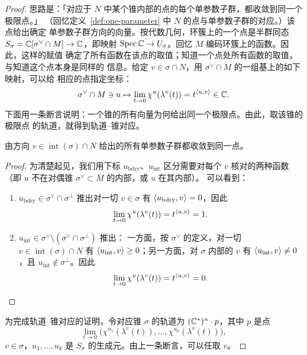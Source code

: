 \begin{proof}
思路是：「对应于 $N$ 中某个锥内部的点的每个单参数子群，都收敛到同一个极限点。」
（回忆定义~\ref{def:one-parameter} 中 $N$ 的点与单参数子群的对应。）该点给出确定
单参数子群方向的向量。按代数几何，环簇上的一个点是半群同态
$S_\sigma = \mathbb{C}[\sigma^\vee\cap M]\to\mathbb{C}$，即映射
$\operatorname{Spec}\mathbb{C}\to U_\sigma$。回忆 $M$ 编码环簇上的函数。因此，这样的赋值
确定了所有函数在该点的取值；知道一个点处所有函数的取值，与知道这个点本身是同样的
信息。给定 $v\in\sigma\cap N$，用 $\sigma^\vee\cap M$ 的一组基上的如下映射，可以给
相应的点指定坐标：
\[
\sigma^\vee\cap M\ni u\mapsto\lim_{t\to0}\chi^u(\lambda^v(t))
= t^{\langle u,v\rangle}\in\mathbb{C}.
\]
下面用一条断言说明：一个锥的所有向量为何给出同一个极限点。由此，取该锥的极限点
的轨道，就得到轨道–锥对应。

\begin{claim}\label{claim:limit-point}
由方向 $v\in\operatorname{int}(\sigma)\cap N$ 给出的所有单参数子群都收敛到同一点。
\end{claim}

\begin{proof}
为清楚起见，我们用下标 $u_{\mathrm{bdry}}$、$u_{\mathrm{int}}$ 区分需要对每个 $v$
核对的两种函数（即 $u$ 不在对偶锥 $\sigma^\vee\subset M$ 的内部，或 $u$ 在其内部）。
可以看到：
\begin{enumerate}[leftmargin=2.6em,itemsep=0.3em]
\item $u_{\mathrm{bdry}}\in\sigma^\vee\cap\sigma^\perp$ 推出对一切 $v\in\sigma$ 有
  $\langle u_{\mathrm{bdry}},v\rangle=0$，因此
  \[
  \lim_{t\to0}\chi^u(\lambda^v(t)) = t^{\langle u,v\rangle} = 1.
  \]
\item $u_{\mathrm{int}}\in\sigma^\vee\setminus(\sigma^\vee\cap\sigma^\perp)$ 推出：
  一方面，按 $\sigma^\vee$ 的定义，对一切 $v\in\operatorname{int}(\sigma)\cap N$
  有 $\langle u_{\mathrm{int}},v\rangle\ge 0$；另一方面，对 $\sigma$ 内部的 $v$ 有
  $\langle u_{\mathrm{int}},v\rangle\ne 0$，且 $u_{\mathrm{int}}\notin\sigma^\perp$。因此
  \[
  \lim_{t\to0}\chi^u(\lambda^v(t)) = t^{\langle u,v\rangle} = 0.
  \]
\end{enumerate}
\end{proof}

为完成轨道–锥对应的证明，令对应锥 $\sigma$ 的轨道为 $(\mathbb{C}^*)^n\cdot p$，其中 $p$
是点
\[
\lim_{t\to0}\bigl(\chi^{u_1}(\lambda^v(t)),\dots,
\chi^{u_k}(\lambda^v(t))\bigr),
\]
$v\in\sigma$，$u_1,\dots,u_k$ 是 $S_\sigma$ 的生成元。由上一条断言，可以任取 $v$。
\end{proof}


